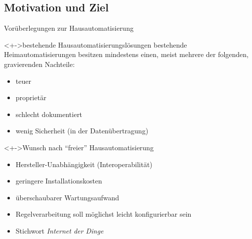 
\subsection{Motivation und Ziel}

\begin{frame}{\insertsubsection}{Vorüberlegungen zur Hausautomatisierung}
	\begin{exampleblock}<+->{bestehende Hausautomatisierungslösungen}
	bestehende Heimautomatisierungen besitzen mindestens einen, meist
	mehrere der folgenden, gravierenden Nachteile:
	\begin{itemize}
	\item	teuer
	\item	proprietär
	\item	schlecht dokumentiert
	\item	wenig Sicherheit (\zB in der Datenübertragung)
	\end{itemize}
	\end{exampleblock}


	\begin{block}<+->{Wunsch nach \enquote{freier} Hausautomatisierung}
		\begin{itemize}
		\item 	Hersteller-Unabhängigkeit (Interoperabilität)
		\item 	geringere Installationskosten
		\item 	überschaubarer Wartungsaufwand
		\item 	Regelverarbeitung soll möglichst leicht konfigurierbar sein
		\item 	Stichwort \emph{Internet der Dinge}
		\end{itemize}
	\end{block}
\end{frame}

